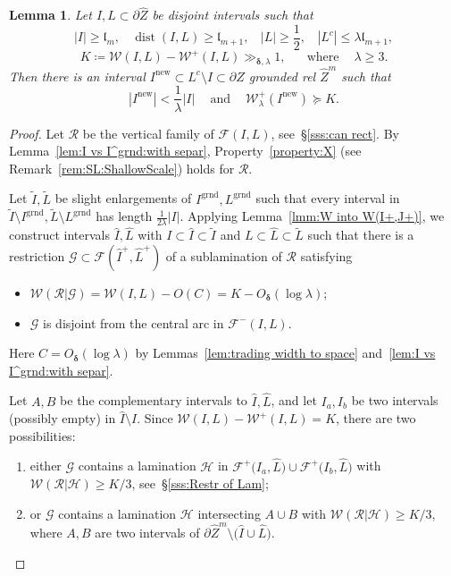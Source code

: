 \documentclass{amsart}
\renewcommand{\sp}{{\ \ }}
\newcommand{\1}{{\mathbb 1 }}
\newcommand{\reminder}[1]{\textsl{$\lhd\rhd$#1$\lhd\rhd$}\marginpar{$\lhd\rhd\lhd\rhd\lhd\rhd$}}
\newcommand{\FamG}{{\mathcal G}}
\newcommand{\FamH}{{\mathcal H}}
\newcommand{\Fam}{{\mathcal F}}
\newcommand{\Width}{{\mathcal W}}
\newcommand\RR{\mathcal{R}}
\newcommand{\wZ}{{\widehat Z}}
\newcommand{\length}{{\mathfrak l}}
\newcommand{\grnd}{{\operatorname{grnd}}}
\newcommand\new{{\operatorname{new}}}
\newtheorem{lem}[thm]{Lemma}
\theoremstyle{remark}
\numberwithin{equation}{section}
\theoremstyle{definition}
\newcommand{\dist}{\operatorname{dist}}
\newcommand{\bdelta}{{\boldsymbol{ \delta}}}
\begin{document}
\begin{lem}
\label{lem:trad width to width+}
Let $I,  L\subset \partial \wZ$ be disjoint intervals such that \[|I|\ge \length_m, \sp \sp \dist( I, L)\ge \length_{m+1}, \sp\sp |L|\ge \frac 12, \sp\sp |L^c|\le \lambda \length_{m+1},\]
\[K\coloneqq \Width(I, L) -\Width^+(I,L) \gg_{\bdelta,\lambda}1,\sp\sp \sp\text{ where  }\sp\sp \lambda \ge 3. \]  
Then there is an interval $I^\new\subset L^c\setminus I\subset \partial Z$ grounded rel $\wZ^m$ such that
\[|I^\new|<\frac 1 \lambda |I|\sp\sp \text{ and }\sp\sp \Width_\lambda^+(I^\new)\succeq K.\]
\end{lem}
\begin{proof}

Let $\RR$ be the vertical family of $\Fam(I,L)$, see~\S\ref{sss:can rect}. By Lemma~\ref{lem:I vs I^grnd:with separ}, Property~\ref{property:X} (see Remark~\ref{rem:SL:ShallowScale}) holds for $\RR$.

Let $\widetilde I, \widetilde L$ be slight enlargements of $I^\grnd,L^\grnd$ such that every interval in $\widetilde I\setminus I^\grnd, \widetilde L\setminus L^\grnd$ has length $\frac{1}{2\lambda }|I|$. Applying Lemma~\ref{lmm:W into W(I+,J+)}, we construct intervals $\widehat I, \widehat L$ with $I\subset \widehat I \subset \widetilde I$ and $L\subset \widehat L \subset \widetilde L$ such that there is a restriction $\FamG\subset \Fam(\widehat I^+, \widehat L^{+})$ of a sublamination of $\RR$ satisfying
\begin{itemize}
\item $\Width(\RR|\FamG)= \Width(I,L)- O(C)= K - O_\bdelta(\log \lambda)$;
\item $\FamG$ is disjoint from the central arc in $\Fam^-(I,L)$.
\end{itemize}
Here $C=O_\bdelta(\log \lambda)$ by Lemmas~\ref{lem:trading  width to space} and~\ref{lem:I vs I^grnd:with separ}. 


Let $A,B$ be the complementary intervals to $\widehat I, \widehat L$, and let  $I_a,I_b$ be two intervals (possibly empty) in $\widehat I\setminus I$. Since $\Width(I,L)-\Width^+(I,L)=K$, there are two possibilities:
\begin{enumerate}[label=\text{(\Roman*)},font=\normalfont,leftmargin=*]
\item \label{cond:prf:lem:W to W^+:1} either $\FamG$ contains a lamination $\FamH$ in $\Fam^+\big(I_a, \widehat L\big)\cup \Fam^+\big(I_b, \widehat L\big)$ with $\Width(\RR|\FamH)\ge K/3$, see~\S\ref{sss:Restr of Lam}; 
\item \label{cond:prf:lem:W to W^+:2} or $\FamG$ contains a lamination $\FamH$ intersecting $A\cup B$ with $\Width(\RR|\FamH)\ge K/3$, where $A,B$ are two intervals of $\partial \wZ^m\setminus \big( \widehat I\cup \widehat L \big)$.
\end{enumerate}



\end{proof}
\end{document}
